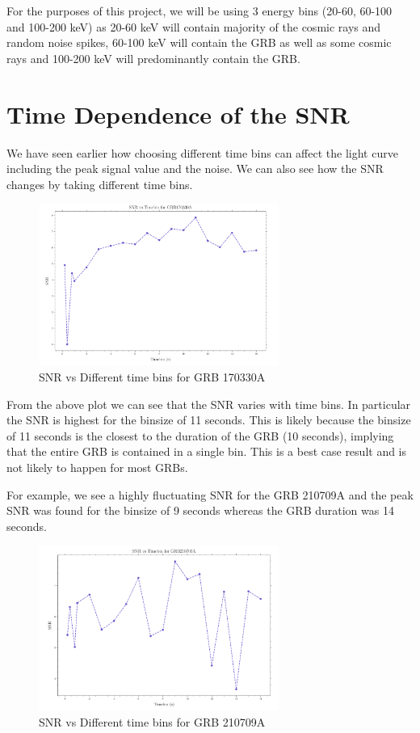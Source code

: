 \documentclass[11pt]{book} %
\begin{document}
For the purposes of this project, we will be using 3 energy bins (20-60, 60-100 and 100-200 keV) as 20-60 keV will contain majority of the cosmic rays and random noise spikes, 60-100 keV will contain the GRB as well as some cosmic rays and 100-200 keV will predominantly contain the GRB.

\newpage

\section{Time Dependence of the SNR}
We have seen earlier how choosing different time bins can affect the light curve including the peak signal value and the noise. We can also see how the SNR changes by taking different time bins. 

\begin{figure}[H]
    \centering
    \includegraphics[width=0.7\textwidth]{Pictures/timevssnr.png}
    \caption{SNR vs Different time bins for GRB 170330A}
\end{figure}


From the above plot we can see that the SNR varies with time bins. In particular the SNR is highest for the binsize of 11 seconds. This is likely because the binsize of 11 seconds is the closest to the duration of the GRB (10 seconds), implying that the entire GRB is contained in a single bin. This is a best case result and is not likely to happen for most GRBs.

For example, we see a highly fluctuating SNR for the GRB 210709A and the peak SNR was found for the binsize of 9 seconds whereas the GRB duration was 14 seconds.

\begin{figure}[H]
    \centering
    \includegraphics[width=0.7\textwidth]{Pictures/snrvstime.png}
    \caption{SNR vs Different time bins for GRB 210709A}
    \label{fig:timebins}
\end{figure}
\end{document}
